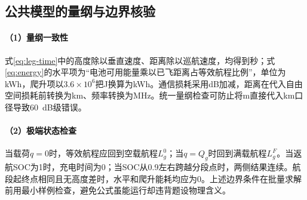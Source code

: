 \subsection{公共模型的量纲与边界核验}
\paragraph{（1）量纲一致性}
式\eqref{eq:leg-time}中的高度除以垂直速度、距离除以巡航速度，均得到秒；式\eqref{eq:energy}的水平项为“电池可用能量乘以已飞距离占等效航程比例”，单位为kWh，爬升项以$3.6\times10^6$把J换算为kWh。通信损耗采用dB加减，距离在代入自由空间损耗前转换为km、频率转换为MHz。统一量纲检查可防止将m直接代入km口径导致60~dB级错误。

\paragraph{（2）极端状态检查}
当载荷$q=0$时，等效航程应回到空载航程$L_g^0$；当$q=Q_g$时回到满载航程$L_g^F$。当返航SOC为1时，充电时间为0；当SOC从0.9左右跨越分段点时，两侧结果连续。航段起终点相同且无高度差时，水平和爬升能耗均应为0。上述边界条件在批量求解前用最小样例检查，避免公式虽能运行却违背题设物理含义。
